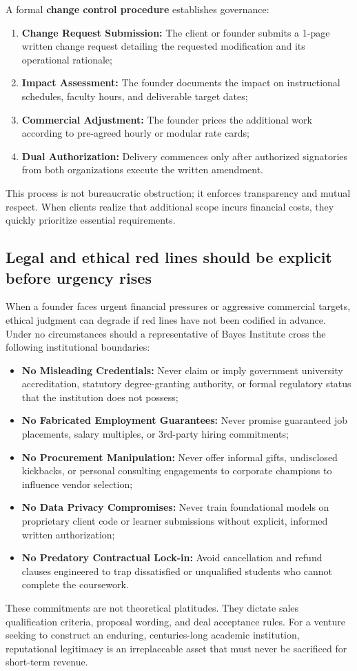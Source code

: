 A formal \textbf{change control procedure} establishes governance:
\begin{enumerate}
\item \textbf{Change Request Submission:} The client or founder submits a 1-page written change request detailing the requested modification and its operational rationale;
\item \textbf{Impact Assessment:} The founder documents the impact on instructional schedules, faculty hours, and deliverable target dates;
\item \textbf{Commercial Adjustment:} The founder prices the additional work according to pre-agreed hourly or modular rate cards;
\item \textbf{Dual Authorization:} Delivery commences only after authorized signatories from both organizations execute the written amendment.
\end{enumerate}
This process is not bureaucratic obstruction; it enforces transparency and mutual respect. When clients realize that additional scope incurs financial costs, they quickly prioritize essential requirements.

\subsection{Legal and ethical red lines should be explicit before urgency rises}

When a founder faces urgent financial pressures or aggressive commercial targets, ethical judgment can degrade if red lines have not been codified in advance. Under no circumstances should a representative of Bayes Institute cross the following institutional boundaries:
\begin{itemize}
\item \textbf{No Misleading Credentials:} Never claim or imply government university accreditation, statutory degree-granting authority, or formal regulatory status that the institution does not possess;
\item \textbf{No Fabricated Employment Guarantees:} Never promise guaranteed job placements, salary multiples, or 3rd-party hiring commitments;
\item \textbf{No Procurement Manipulation:} Never offer informal gifts, undisclosed kickbacks, or personal consulting engagements to corporate champions to influence vendor selection;
\item \textbf{No Data Privacy Compromises:} Never train foundational models on proprietary client code or learner submissions without explicit, informed written authorization;
\item \textbf{No Predatory Contractual Lock-in:} Avoid cancellation and refund clauses engineered to trap dissatisfied or unqualified students who cannot complete the coursework.
\end{itemize}
These commitments are not theoretical platitudes. They dictate sales qualification criteria, proposal wording, and deal acceptance rules. For a venture seeking to construct an enduring, centuries-long academic institution, reputational legitimacy is an irreplaceable asset that must never be sacrificed for short-term revenue.
